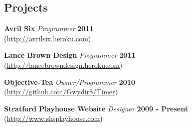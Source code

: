 \documentclass[margin,line]{res}
\begin{document}
{\begin{resume}
          {\color{WildStrawberry}
          \vspace{-.13in}
          \section{\sc Projects}}
          \color{black}
          {\bf Avril Six} {\em Programmer} \hfill {\bf 2011}\\
          (\url{http://avrilsix.heroku.com})

          {\bf Lance Brown Design} {\em Programmer} \hfill {\bf 2011\\}
          (\url{http://lancebrowndesign.heroku.com})

          {\bf Objective-Tea} {\em Owner/Programmer} \hfill  {\bf 2010}\\
          (\url{http://github.com/Gwydir8/Timer})

          {\bf Stratford Playhouse Website} {\em Designer} \hfill  {\bf 2009 - Present}\\
          (\url{http://www.shsplayhouse.com})


\end{resume}}
\end{document}
